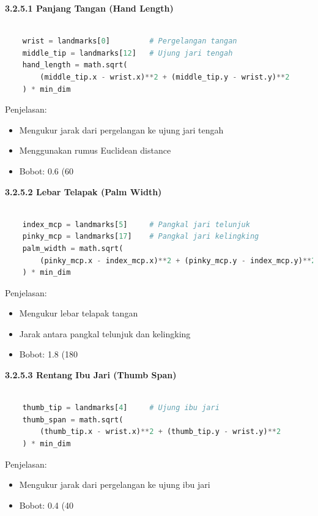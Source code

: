 \documentclass[11pt,a4paper]{article}
\begin{document}
    \noindent\textbf{3.2.5.1 Panjang Tangan (Hand Length)}
    \begin{lstlisting}[language=Python, caption=Panjang Tangan (Hand Length)]
        
    wrist = landmarks[0]         # Pergelangan tangan
    middle_tip = landmarks[12]   # Ujung jari tengah
    hand_length = math.sqrt(
        (middle_tip.x - wrist.x)**2 + (middle_tip.y - wrist.y)**2
    ) * min_dim
    \end{lstlisting}
    Penjelasan:
    \begin{itemize}
        \item Mengukur jarak dari pergelangan ke ujung jari tengah
        \item Menggunakan rumus Euclidean distance
        \item Bobot: 0.6 (60%
    \end{itemize}

    \noindent\textbf{3.2.5.2 Lebar Telapak (Palm Width)}
    \begin{lstlisting}[language=Python, caption=Lebar Telapak (Palm Width)]
        
    index_mcp = landmarks[5]     # Pangkal jari telunjuk
    pinky_mcp = landmarks[17]    # Pangkal jari kelingking
    palm_width = math.sqrt(
        (pinky_mcp.x - index_mcp.x)**2 + (pinky_mcp.y - index_mcp.y)**2
    ) * min_dim
    \end{lstlisting}
    Penjelasan:
    \begin{itemize}
        \item Mengukur lebar telapak tangan
        \item Jarak antara pangkal telunjuk dan kelingking
        \item Bobot: 1.8 (180%
    \end{itemize}

    \noindent\textbf{3.2.5.3 Rentang Ibu Jari (Thumb Span)}
    \begin{lstlisting}[language=Python, caption=Ekstraksi Koordinat]
        
    thumb_tip = landmarks[4]     # Ujung ibu jari
    thumb_span = math.sqrt(
        (thumb_tip.x - wrist.x)**2 + (thumb_tip.y - wrist.y)**2
    ) * min_dim
    \end{lstlisting}
    Penjelasan: 
    \begin{itemize}
        \item Mengukur jarak dari pergelangan ke ujung ibu jari
        \item Bobot: 0.4 (40%
    \end{itemize}
\end{document}
